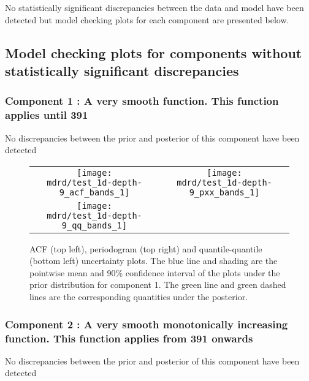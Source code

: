 \documentclass{article} %
\begin{document}
No statistically significant discrepancies between the data and model have been detected but model checking plots for each component are presented below.

\subsection{Model checking plots for components without statistically significant discrepancies}

\subsubsection{Component 1 : A very smooth function. This function applies until  391}

No discrepancies between the prior and posterior of this component have been detected

\begin{figure}[H]
\newcommand{\wmgd}{0.5\columnwidth}
\newcommand{\hmgd}{3.0cm}
\newcommand{\mdrd}{test_1d-depth-9}
\newcommand{\mbm}{\hspace{-0.3cm}}
\begin{tabular}{cc}
\mbm \texttt{[image: \\mdrd/test\_1d-depth-9\_acf\_bands\_1]} & \texttt{[image: \\mdrd/test\_1d-depth-9\_pxx\_bands\_1]} \\
\mbm \texttt{[image: \\mdrd/test\_1d-depth-9\_qq\_bands\_1]}
\end{tabular}
\caption{
ACF (top left), periodogram (top right) and quantile-quantile (bottom left) uncertainty plots.
The blue line and shading are the pointwise mean and 90\% confidence interval of the plots under the prior distribution for component 1.
The green line and green dashed lines are the corresponding quantities under the posterior.}
\label{fig:check1}
\end{figure}

\subsubsection{Component 2 : A very smooth monotonically increasing function. This function applies from  391 onwards}

No discrepancies between the prior and posterior of this component have been detected
\end{document}
